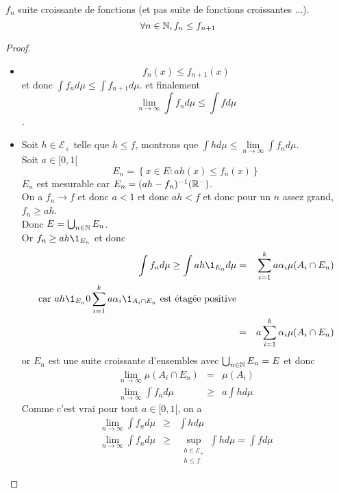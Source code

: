 \begin{remarque}
	$f_n$ suite croissante de fonctions (et pas suite de fonctions croissantes ...).
	$$ \forall n \in \mathbb{N}, f_n \leq f_{n+1} $$
\end{remarque}


\begin{proof}
	\begin{itemize}
		\item $$f_n (x) \leq f_{n+1}(x)$$ et donc $\int f_n d\mu \leq \int f_{n+1} d\mu$.
		      et finalement $$\lim\limits_{n \to \infty} \int f_n d\mu \leq \int f d\mu$$.
		\item Soit $h \in \mathcal{E}_+$ telle que $h \leq f$, montrons que $\int h d\mu \leq \lim\limits_{n \to \infty} \int f_n d\mu$.\\
		      Soit $a \in [0,1[$
		      $$ E_n = \left\{ x \in E :  ah(x) \leq f_n(x) \right\} $$
		      $E_n$ est mesurable car $E_n = (ah-f_n)^{-1}(\mathbb{R}^-)$.\\
		      On a $f_n \to f$ et donc $a < 1$ et donc $ah < f$ et donc pour un
		      $n$ assez grand, $f_n \geq ah$.\\
		      Donc $E = \bigcup_{n \in \mathbb{N}} E_n$.\\
		      Or $ f_n \geq ah \1_{E_n} $ et donc
		      \begin{eqnarray*}
			      \int f_n d\mu \geq \int ah \1_{E_n} d\mu &=& \sum_{i=1}^k a \alpha_i \mu (A_i \cap E_n) \\
			      \text{car} \ ah\1_{E_n} 0 \sum_{i=1}^k a \alpha_i \1_{A_i \cap E_n} \  \text{est étagée positive}& \\
			      &=& a \sum_{i=1}^k \alpha_i \mu(A_i \cap E_n) \\
		      \end{eqnarray*}
		      or $E_n$ est une suite croissante d'ensembles avec $\bigcup_{n \in \mathbb{N}} E_n = E$ et donc
		      \begin{eqnarray*}
			      \lim\limits_{n \to \infty} \mu(A_i \cap E_n) &=& \mu(A_i)\\
			      \lim \limits_{n \to \infty} \int f_n d\mu &\geq& a \int h d\mu
		      \end{eqnarray*}
		      Comme c'est vrai pour tout $a \in [0,1[$, on a
		      \begin{eqnarray*}
			      \lim \limits_{n \to \infty} \int f_n d\mu &\geq&  \int h d\mu\\
			      \lim \limits_{n \to \infty} \int f_n d\mu &\geq& \sup\limits_{\substack{h \in \mathcal{E}_+ \\ h \leq f}} \int h d\mu = \int f d\mu
		      \end{eqnarray*}
	\end{itemize}
\end{proof}


